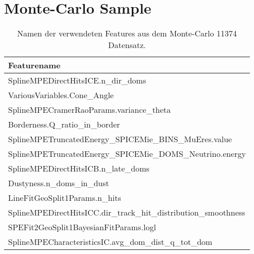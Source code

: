 \chapter{Monte-Carlo Sample}
    
\begin{table}
    \centering
    \caption{Namen der verwendeten Features aus dem Monte-Carlo 11374 Datensatz.}
    \label{tab:feature}
    \begin{tabular}{l}
        \toprule
        Featurename \\
        \midrule
        SplineMPEDirectHitsICE.n\_dir\_doms \\
        VariousVariables.Cone\_Angle \\
        SplineMPECramerRaoParams.variance\_theta \\
        Borderness.Q\_ratio\_in\_border \\
        SplineMPETruncatedEnergy\_SPICEMie\_BINS\_MuEres.value \\
        SplineMPETruncatedEnergy\_SPICEMie\_DOMS\_Neutrino.energy \\
        SplineMPEDirectHitsICB.n\_late\_doms \\
        Dustyness.n\_doms\_in\_dust \\
        LineFitGeoSplit1Params.n\_hits \\
        SplineMPEDirectHitsICC.dir\_track\_hit\_distribution\_smoothness \\
        SPEFit2GeoSplit1BayesianFitParams.logl \\
        SplineMPECharacteristicsIC.avg\_dom\_dist\_q\_tot\_dom \\
        \bottomrule
    \end{tabular}
\end{table}